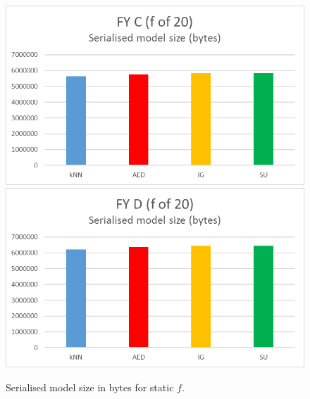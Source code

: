 \begin{figure}[hp]
\includegraphics[scale=0.17]{Graphs/FY_C/bytes20}
\includegraphics[scale=0.17]{Graphs/FY_D/bytes20}
\caption{Serialised model size in bytes for static $f$.}
\label{fig:bytes}
\end{figure}


